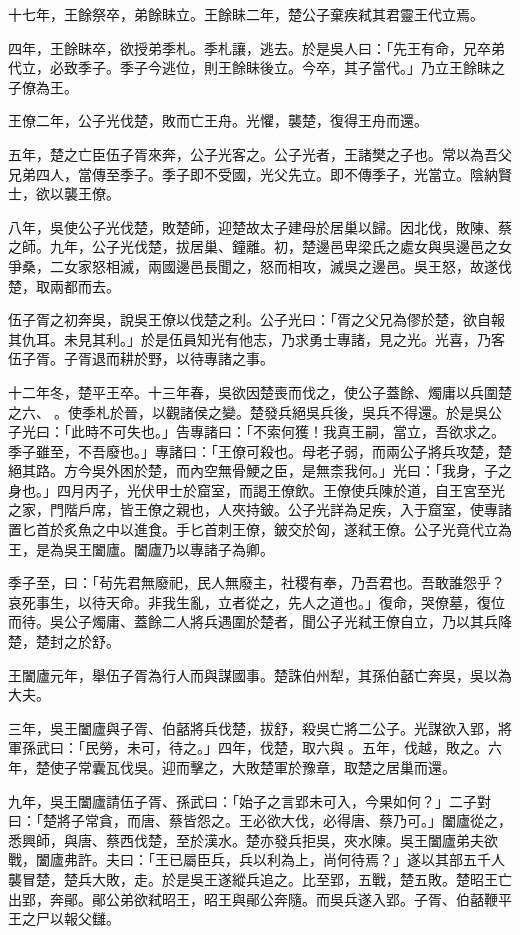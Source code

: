 \begin{pinyinscope}
十七年，王餘祭卒，弟餘眛立。王餘眛二年，楚公子棄疾弒其君靈王代立焉。

四年，王餘眛卒，欲授弟季札。季札讓，逃去。於是吳人曰：「先王有命，兄卒弟代立，必致季子。季子今逃位，則王餘眛後立。今卒，其子當代。」乃立王餘眛之子僚為王。

王僚二年，公子光伐楚，敗而亡王舟。光懼，襲楚，復得王舟而還。

五年，楚之亡臣伍子胥來奔，公子光客之。公子光者，王諸樊之子也。常以為吾父兄弟四人，當傳至季子。季子即不受國，光父先立。即不傳季子，光當立。陰納賢士，欲以襲王僚。

八年，吳使公子光伐楚，敗楚師，迎楚故太子建母於居巢以歸。因北伐，敗陳、蔡之師。九年，公子光伐楚，拔居巢、鐘離。初，楚邊邑卑梁氏之處女與吳邊邑之女爭桑，二女家怒相滅，兩國邊邑長聞之，怒而相攻，滅吳之邊邑。吳王怒，故遂伐楚，取兩都而去。

伍子胥之初奔吳，說吳王僚以伐楚之利。公子光曰：「胥之父兄為僇於楚，欲自報其仇耳。未見其利。」於是伍員知光有他志，乃求勇士專諸，見之光。光喜，乃客伍子胥。子胥退而耕於野，以待專諸之事。

十二年冬，楚平王卒。十三年春，吳欲因楚喪而伐之，使公子蓋餘、燭庸以兵圍楚之六、𤅬。使季札於晉，以觀諸侯之變。楚發兵絕吳兵後，吳兵不得還。於是吳公子光曰：「此時不可失也。」告專諸曰：「不索何獲！我真王嗣，當立，吾欲求之。季子雖至，不吾廢也。」專諸曰：「王僚可殺也。母老子弱，而兩公子將兵攻楚，楚絕其路。方今吳外困於楚，而內空無骨鯁之臣，是無柰我何。」光曰：「我身，子之身也。」四月丙子，光伏甲士於窟室，而謁王僚飲。王僚使兵陳於道，自王宮至光之家，門階戶席，皆王僚之親也，人夾持鈹。公子光詳為足疾，入于窟室，使專諸置匕首於炙魚之中以進食。手匕首刺王僚，鈹交於匈，遂弒王僚。公子光竟代立為王，是為吳王闔廬。闔廬乃以專諸子為卿。

季子至，曰：「茍先君無廢祀，民人無廢主，社稷有奉，乃吾君也。吾敢誰怨乎？哀死事生，以待天命。非我生亂，立者從之，先人之道也。」復命，哭僚墓，復位而待。吳公子燭庸、蓋餘二人將兵遇圍於楚者，聞公子光弒王僚自立，乃以其兵降楚，楚封之於舒。

王闔廬元年，舉伍子胥為行人而與謀國事。楚誅伯州犁，其孫伯嚭亡奔吳，吳以為大夫。

三年，吳王闔廬與子胥、伯嚭將兵伐楚，拔舒，殺吳亡將二公子。光謀欲入郢，將軍孫武曰：「民勞，未可，待之。」四年，伐楚，取六與𤅬。五年，伐越，敗之。六年，楚使子常囊瓦伐吳。迎而擊之，大敗楚軍於豫章，取楚之居巢而還。

九年，吳王闔廬請伍子胥、孫武曰：「始子之言郢未可入，今果如何？」二子對曰：「楚將子常貪，而唐、蔡皆怨之。王必欲大伐，必得唐、蔡乃可。」闔廬從之，悉興師，與唐、蔡西伐楚，至於漢水。楚亦發兵拒吳，夾水陳。吳王闔廬弟夫欲戰，闔廬弗許。夫曰：「王已屬臣兵，兵以利為上，尚何待焉？」遂以其部五千人襲冒楚，楚兵大敗，走。於是吳王遂縱兵追之。比至郢，五戰，楚五敗。楚昭王亡出郢，奔鄖。鄖公弟欲弒昭王，昭王與鄖公奔隨。而吳兵遂入郢。子胥、伯嚭鞭平王之尸以報父讎。


\end{pinyinscope}
